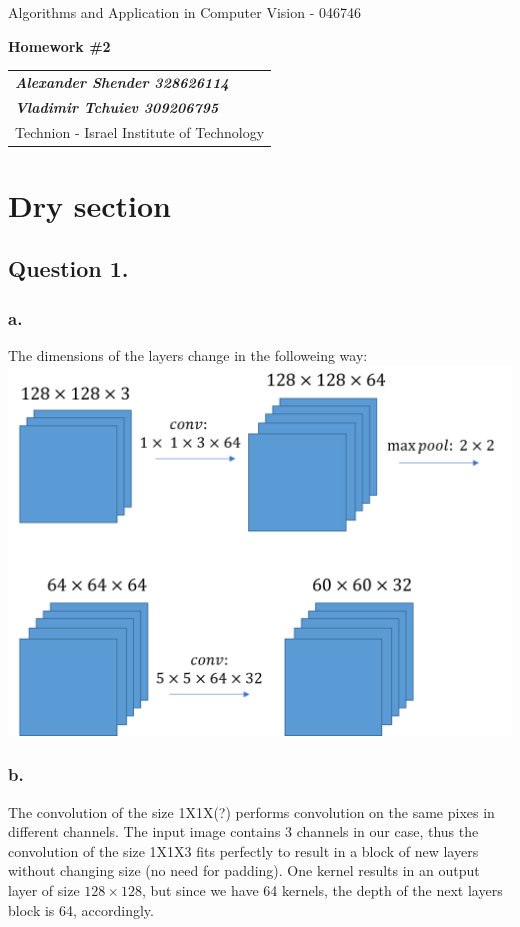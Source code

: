 \documentclass[a4paper]{iacas}
\begin{document}
\begin{center}
 \large Algorithms and Application in Computer Vision - 046746
 \end{center}
\begin{center}
\large\textbf{Homework \#2}
 \end{center}


\begin{tabular}{l}
\\
{\bf\textit{Alexander Shender 328626114}} \\
{\bf\textit{Vladimir Tchuiev 309206795}} \\
Technion - Israel Institute of Technology
\end{tabular}


\newpage

\section{Dry section}

\subsection{Question 1.}
\subsubsection{a.}

The dimensions of the layers change in the followeing way:
\newline
\includegraphics[scale=0.8]{imgs/q_1_1.png}
\newline
\subsubsection{b.}
The convolution of the size 1X1X(?) performs convolution on the same pixes in different channels. The input image contains 3 channels in our case, thus the convolution of the size 1X1X3 fits perfectly to result in a block of new layers without changing size (no need for padding). One kernel results in an output layer of size $128\times128$, but since we have 64 kernels, the depth of the next layers block is 64, accordingly.
\end{document}
